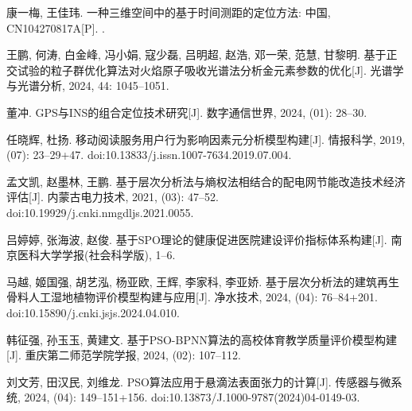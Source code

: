 \documentclass[withoutpreface,bwprint,12pt,a4paper]{cumcmthesis}
\begin{document}
\begin{thebibliography}{99} %

康一梅, 王佳玮.
\newblock 一种三维空间中的基于时间测距的定位方法: 中国, CN104270817A[P].
.

王鹏, 何涛, 白金峰, 冯小娟, 寇少磊, 吕明超, 赵浩, 邓一荣, 范慧, 甘黎明.
\newblock 基于正交试验的粒子群优化算法对火焰原子吸收光谱法分析金元素参数的优化[J].
\newblock 光谱学与光谱分析, 2024, 44: 1045--1051.

董冲.
\newblock GPS与INS的组合定位技术研究[J].
\newblock 数字通信世界, 2024, (01): 28--30.

任晓辉, 杜扬.
\newblock 移动阅读服务用户行为影响因素元分析模型构建[J].
\newblock 情报科学, 2019, (07): 23--29+47.
\newblock doi:10.13833/j.issn.1007-7634.2019.07.004.

孟文凯, 赵墨林, 王鹏.
\newblock 基于层次分析法与熵权法相结合的配电网节能改造技术经济评估[J].
\newblock 内蒙古电力技术, 2021, (03): 47--52.
\newblock doi:10.19929/j.cnki.nmgdljs.2021.0055.

吕婷婷, 张海波, 赵俊.
\newblock 基于SPO理论的健康促进医院建设评价指标体系构建[J].
\newblock 南京医科大学学报(社会科学版), 1--6.

马越, 姬国强, 胡艺泓, 杨亚欧, 王辉, 李家科, 李亚娇.
\newblock 基于层次分析法的建筑再生骨料人工湿地植物评价模型构建与应用[J].
\newblock 净水技术, 2024, (04): 76--84+201.
\newblock doi:10.15890/j.cnki.jsjs.2024.04.010.

韩征强, 孙玉玉, 黄建文.
\newblock 基于PSO-BPNN算法的高校体育教学质量评价模型构建[J].
\newblock 重庆第二师范学院学报, 2024, (02): 107--112.

刘文芳, 田汉民, 刘维龙.
\newblock PSO算法应用于悬滴法表面张力的计算[J].
\newblock 传感器与微系统, 2024, (04): 149--151+156.
\newblock doi:10.13873/J.1000-9787(2024)04-0149-03.

\end{thebibliography}
\end{document}
